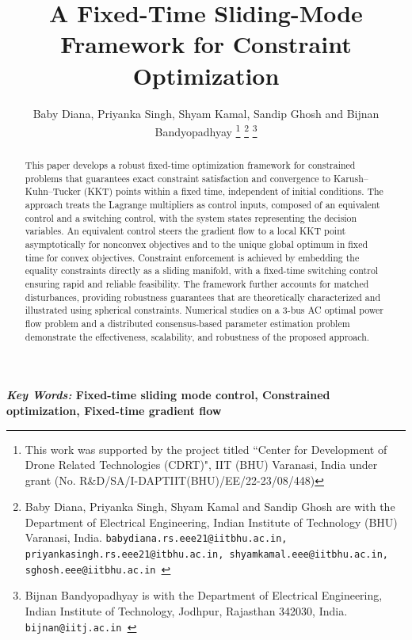 \documentclass[letterpaper, 10 pt, conference]{ieeeconf}
\begin{document}
\title{A Fixed-Time Sliding-Mode Framework for Constraint Optimization}

\author{Baby Diana, Priyanka Singh, Shyam Kamal, Sandip Ghosh and Bijnan Bandyopadhyay
\thanks{This work was supported by the project titled ``Center for Development of Drone Related Technologies (CDRT)", IIT (BHU) Varanasi, India under grant (No. R\&D/SA/I-DAPTIIT(BHU)/EE/22-23/08/448)}
\thanks{Baby Diana, Priyanka Singh, Shyam Kamal and Sandip Ghosh are with the Department of Electrical Engineering,  Indian Institute of Technology (BHU) Varanasi, India. 
        {\tt\small babydiana.rs.eee21@iitbhu.ac.in, priyankasingh.rs.eee21@itbhu.ac.in, shyamkamal.eee@iitbhu.ac.in, sghosh.eee@iitbhu.ac.in }}
        \thanks{Bijnan Bandyopadhyay is with the Department of Electrical Engineering,
Indian Institute of Technology, Jodhpur, Rajasthan 342030, India. {\tt\small bijnan@iitj.ac.in }}
}


\maketitle

\begin{abstract}
This paper develops a robust fixed-time optimization framework for constrained problems that guarantees exact constraint satisfaction and convergence to Karush–Kuhn–Tucker (KKT) points within a fixed time, independent of initial conditions. The approach treats the Lagrange multipliers as control inputs, composed of an equivalent control and a switching control, with the system states representing the decision variables. An equivalent control steers the gradient flow to a local KKT point asymptotically for nonconvex objectives and to the unique global optimum in fixed time for convex objectives. Constraint enforcement is achieved by embedding the equality constraints directly as a sliding manifold, with a fixed-time switching control ensuring rapid and reliable feasibility. The framework further accounts for matched disturbances, providing robustness guarantees that are theoretically characterized and illustrated using spherical constraints. Numerical studies on a 3-bus AC optimal power flow problem and a distributed consensus-based parameter estimation problem demonstrate the effectiveness, scalability, and robustness of the proposed approach.
\end{abstract}

\textbf{\textit{Key Words: } 
Fixed-time sliding mode control, Constrained optimization, Fixed-time gradient flow}
\end{document}
